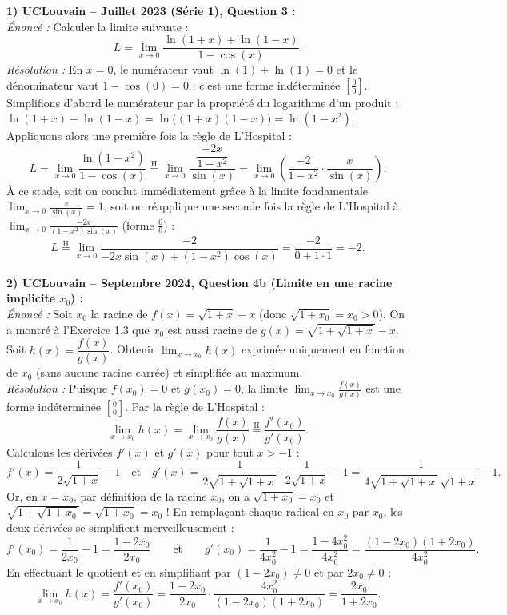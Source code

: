 \begin{exemple}
\textbf{1) UCLouvain -- Juillet 2023 (Série 1), Question 3 :}\\
\emph{Énoncé :} Calculer la limite suivante :
\[
    L = \lim_{x \to 0} \frac{\ln(1+x) + \ln(1-x)}{1 - \cos(x)}.
\]
\emph{Résolution :} En $x = 0$, le numérateur vaut $\ln(1) + \ln(1) = 0$ et le dénominateur vaut $1 - \cos(0) = 0$ : c'est une forme indéterminée $\left[\frac{0}{0}\right]$.
Simplifions d'abord le numérateur par la propriété du logarithme d'un produit : $\ln(1+x) + \ln(1-x) = \ln\bigl((1+x)(1-x)\bigr) = \ln(1-x^2)$. Appliquons alors une première fois la règle de L'Hospital :
\[
    L = \lim_{x \to 0} \frac{\ln(1-x^2)}{1 - \cos(x)} \stackrel{\text{H}}{=} \lim_{x \to 0} \frac{\dfrac{-2x}{1-x^2}}{\sin(x)} = \lim_{x \to 0} \left(\frac{-2}{1-x^2} \cdot \frac{x}{\sin(x)}\right).
\]
À ce stade, soit on conclut immédiatement grâce à la limite fondamentale $\lim_{x \to 0} \frac{x}{\sin(x)} = 1$, soit on réapplique une seconde fois la règle de L'Hospital à $\lim_{x \to 0} \frac{-2x}{(1-x^2)\sin(x)}$ (forme $\frac{0}{0}$) :
\[
    L \stackrel{\text{H}}{=} \lim_{x \to 0} \frac{-2}{-2x\sin(x) + (1-x^2)\cos(x)} = \frac{-2}{0 + 1 \cdot 1} = \boxed{-2}.
\]

\medskip
\textbf{2) UCLouvain -- Septembre 2024, Question 4b (Limite en une racine implicite $x_0$) :}\\
\emph{Énoncé :} Soit $x_0$ la racine de $f(x) = \sqrt{1+x} - x$ (donc $\sqrt{1+x_0} = x_0 > 0$). On a montré à l'Exercice 1.3 que $x_0$ est aussi racine de $g(x) = \sqrt{1 + \sqrt{1+x}} - x$. Soit $h(x) = \dfrac{f(x)}{g(x)}$. Obtenir $\lim_{x \to x_0} h(x)$ exprimée uniquement en fonction de $x_0$ (sans aucune racine carrée) et simplifiée au maximum.\\
\emph{Résolution :} Puisque $f(x_0) = 0$ et $g(x_0) = 0$, la limite $\lim_{x \to x_0} \frac{f(x)}{g(x)}$ est une forme indéterminée $\left[\frac{0}{0}\right]$. Par la règle de L'Hospital :
\[
    \lim_{x \to x_0} h(x) = \lim_{x \to x_0} \frac{f(x)}{g(x)} \stackrel{\text{H}}{=} \frac{f'(x_0)}{g'(x_0)}.
\]
Calculons les dérivées $f'(x)$ et $g'(x)$ pour tout $x > -1$ :
\[
    f'(x) = \frac{1}{2\sqrt{1+x}} - 1 \quad \text{et} \quad g'(x) = \frac{1}{2\sqrt{1 + \sqrt{1+x}}} \cdot \frac{1}{2\sqrt{1+x}} - 1 = \frac{1}{4\sqrt{1+\sqrt{1+x}}\,\sqrt{1+x}} - 1.
\]
Or, en $x = x_0$, par définition de la racine $x_0$, on a $\sqrt{1+x_0} = x_0$ et $\sqrt{1 + \sqrt{1+x_0}} = \sqrt{1+x_0} = x_0$ ! En remplaçant chaque radical en $x_0$ par $x_0$, les deux dérivées se simplifient merveilleusement :
\[
    f'(x_0) = \frac{1}{2x_0} - 1 = \frac{1 - 2x_0}{2x_0} \qquad \text{et} \qquad g'(x_0) = \frac{1}{4x_0^2} - 1 = \frac{1 - 4x_0^2}{4x_0^2} = \frac{(1 - 2x_0)(1 + 2x_0)}{4x_0^2}.
\]
En effectuant le quotient et en simplifiant par $(1 - 2x_0) \neq 0$ et par $2x_0 \neq 0$ :
\[
    \lim_{x \to x_0} h(x) = \frac{f'(x_0)}{g'(x_0)} = \frac{1 - 2x_0}{2x_0} \cdot \frac{4x_0^2}{(1 - 2x_0)(1 + 2x_0)} = \boxed{\frac{2x_0}{1 + 2x_0}}.
\]


\end{exemple}
